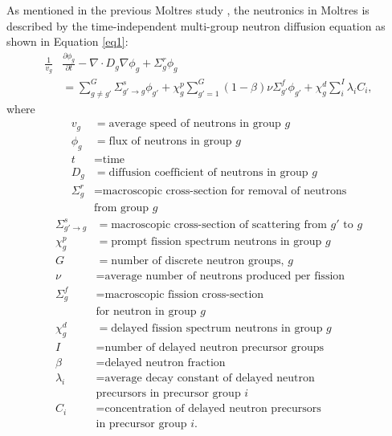 \documentclass{anstrans}
\begin{document}
	As mentioned in the previous Moltres study
	\cite{lindsay_introduction_2018}, the neutronics in Moltres is described by
	the time-independent multi-group neutron diffusion equation as shown in
	Equation \ref{eq1}:
%
\begin{align}
	\frac{1}{v_g} &\frac{\partial \phi_g}{\partial t} - \nabla \cdot D_g \nabla
	\phi_g + \Sigma^r_g \phi_g \nonumber \\ 
	&= \sum^G_{g \neq g'} \Sigma^s_{g' \rightarrow g} \phi_{g'} + \chi^p_g
	\sum^G_{g'=1} (1-\beta) \nu \Sigma^f_{g'} \phi_{g'} + \chi^d_g \sum^I_i
	\lambda_i C_i, \label{eq1}
\end{align}
%
	where
{\small
\begin{align}
	v_g &= \text{average speed of neutrons in group }g \\
	\phi_g &= \text{flux of neutrons in group }g \\
	t &= \text{time} \\
	D_g &= \text{diffusion coefficient of neutrons in group }g \\
	\Sigma^r_g &= \text{macroscopic cross-section for removal of neutrons} 
	\nonumber \\
	&\text{from group }g
\end{align}
%
\begin{align}
	\Sigma^s_{g' \rightarrow g} &= \text{macroscopic cross-section of
	scattering from }g' \text{ to }g \\
	\chi^p_g &= \text{prompt fission spectrum neutrons in group }g \\
	G &= \text{number of discrete neutron groups, }g \\
	\nu &= \text{average number of neutrons produced per fission} \\
	\Sigma^f_{g} &= \text{macroscopic fission cross-section} \nonumber \\
	&\text{for neutron in group }g \\
	\chi^d_g &= \text{delayed fission spectrum neutrons in group }g \\
	I &= \text{number of delayed neutron precursor groups} \\
	\beta &= \text{delayed neutron fraction} \\
	\lambda_i &= \text{average decay constant of delayed neutron} \nonumber \\
	&\text{precursors in precursor group }i \\
	C_i &= \text{concentration of delayed neutron precursors} \nonumber \\
	&\text{in precursor group }i .
\end{align}
}
\end{document}
